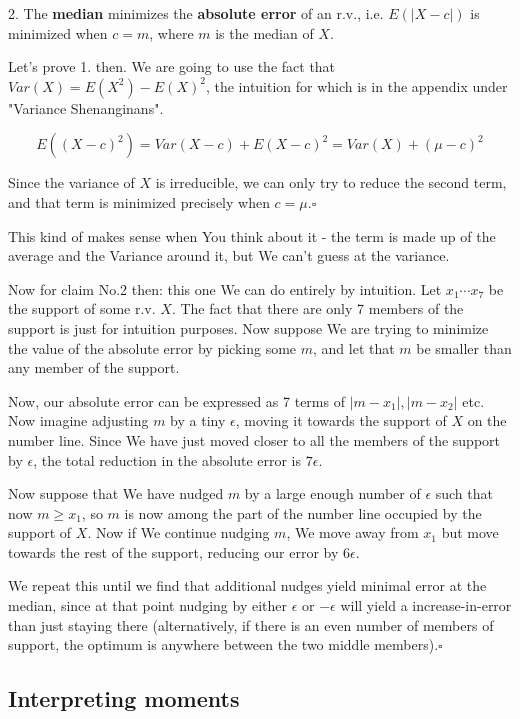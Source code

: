 \documentclass{article}
\newcommand{\qed}{\hfill$\square$}
\begin{document}
		2. The \textbf{median} minimizes the \textbf{absolute error} of an r.v., i.e. $E(\vert X-c\vert)$ is minimized when $c = m$, where $m$ is the median of $X$.
		
		Let's prove 1. then. We are going to use the fact that $Var(X) = E(X^2) - E(X)^2$, the intuition for which is in the appendix under "Variance Shenanginans".
		
		\[ E((X-c)^2) = Var(X-c) + E(X-c)^2 = Var(X) + (\mu - c)^2\]
	
		Since the variance of $X$ is irreducible, we can only try to reduce the second term, and that term is minimized precisely when $c=\mu$.\qed
		
		This kind of makes sense when You think about it - the term is made up of the average and the Variance around it, but We can't guess at the variance.
		
		Now for claim No.2 then: this one We can do entirely by intuition. Let $x_1\cdots x_7$ be the support of some r.v. $X$. The fact that there are only 7 members of the support is just for intuition purposes. Now suppose We are trying to minimize the value of the absolute error by picking some $m$, and let that $m$ be smaller than any member of the support.
		
		Now, our absolute error can be expressed as 7 terms of $|m-x_1|, |m - x_2|$ etc. Now imagine adjusting $m$ by a tiny $\epsilon$, moving it towards the support of $X$ on the number line. Since We have just moved closer to all the members of the support by $\epsilon$, the total reduction in the absolute error is $7\epsilon$.
		
		Now suppose that We have nudged $m$ by a large enough number of $\epsilon$ such that now $m\ge x_1$, so $m$ is now among the part of the number line occupied by the support of $X$. Now if We continue nudging $m$, We move away from $x_1$ but move towards the rest of the support, reducing our error by $6\epsilon$. 
		
		We repeat this until we find that additional nudges yield minimal error at the median, since at that point nudging by either $\epsilon$ or $-\epsilon$ will yield a increase-in-error than just staying there (alternatively, if there is an even number of members of support, the optimum is anywhere between the two middle members).\qed
		
	\subsection{Interpreting moments}
	
\end{document}
